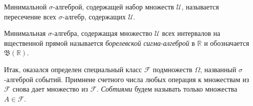 \begin{to_def}
    Минимальной $\sigma$-алгеброй, содержащей набор множеств $\mathcal U$, называется пересечение всех $\sigma$-алгебр, содержащих $\mathcal U$. 
\end{to_def}


\begin{to_def}
    Минимальная $\sigma$-алгебра, содержащая множество $\mathcal U$ всех интервалов на вщественной прямой называется \textit{борелевской} \textit{сигма}-\textit{алгеброй} в $\mathbb{R}$ и обозначается $\mathfrak B (\mathbb{R})$.
\end{to_def}

Итак, оказался определен специальный класс $\mathcal F$ подмножеств $\Omega$, названный $\sigma$-алгеброй событий. Примнеие счетного числа любых операция к множествам из $\mathcal F$ снова дает множество из $\mathcal F$. \textit{Собтиями} будем называть только множества $A \in \mathcal F$.